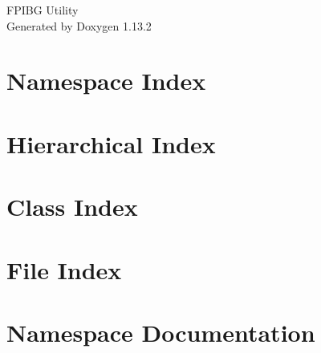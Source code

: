 \documentclass[twoside]{book}
\newcommand{\+}{\discretionary{\mbox{\scriptsize$\hookleftarrow$}}{}{}}
\newcommand{\clearemptydoublepage}{%
    \newpage{\pagestyle{empty}\cleardoublepage}%
  }
\begin{document}
  \raggedbottom
    \hypersetup{pageanchor=false,
                bookmarksnumbered=true,
                pdfencoding=unicode
               }
  \begin{titlepage}
  \vspace*{7cm}
  \begin{center}%
  {\Large FPIBG Utility}\\
  \vspace*{1cm}
  {\large Generated by Doxygen 1.13.2}\\
  \end{center}
  \end{titlepage}
  \clearemptydoublepage
  \tableofcontents
  \clearemptydoublepage
  \hypersetup{pageanchor=true}

\chapter{Namespace Index}

\chapter{Hierarchical Index}

\chapter{Class Index}

\chapter{File Index}

\chapter{Namespace Documentation}

































\end{document}
